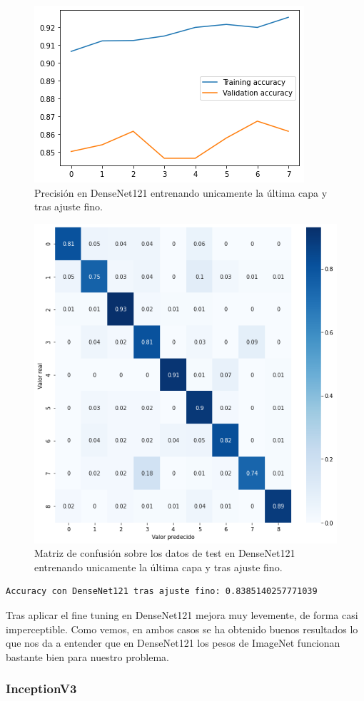 \begin{figure}[H]
  \centering
  \includegraphics[width=0.5\linewidth]{Imagenes/entrenamiento_redes/ult/densenet_fine_acc.png}
  \caption{Precisión en DenseNet121 entrenando unicamente la última capa y tras ajuste fino.}
\end{figure}

\begin{figure}[H]
  \centering
  \includegraphics[width=0.5\linewidth]{Imagenes/entrenamiento_redes/ult/densenet_fine_matriz.png}
  \caption{Matriz de confusión sobre los datos de test en DenseNet121 entrenando unicamente la última capa y tras ajuste fino.}
\end{figure}


\begin{lstlisting}
Accuracy con DenseNet121 tras ajuste fino: 0.8385140257771039
\end{lstlisting}

Tras aplicar el fine tuning en DenseNet121 mejora muy levemente, de forma casi imperceptible. Como vemos, en ambos casos se ha obtenido buenos resultados lo que nos da a entender que en DenseNet121 los pesos de ImageNet funcionan bastante bien para nuestro problema.


\subsubsection{InceptionV3}

